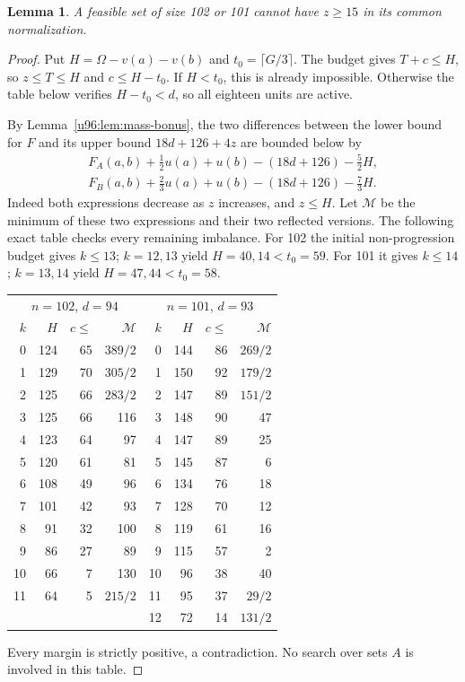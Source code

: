 \documentclass[11pt,a4paper]{article}
\newtheorem{lemma}[theorem]{Lemma}
\theoremstyle{remark}
\begin{document}
\begin{lemma}\label{u96:lem:high100}
A feasible set of size 102 or 101 cannot have $z\geq15$ in its common
normalization.
\end{lemma}
\begin{proof}
Put $H=\Omega-v(a)-v(b)$ and $t_0=\lceil G/3\rceil$.
The budget gives $T+c\leq H$, so $z\leq T\leq H$ and $c\leq H-t_0$.
If $H<t_0$, this is already impossible. Otherwise the table below verifies
$H-t_0<d$, so all eighteen units are active.

By Lemma~\ref{u96:lem:mass-bonus}, the two differences between the lower bound
for $F$ and its upper bound $18d+126+4z$ are bounded below by
\[
\begin{split}
 F_A(a,b)+\tfrac12u(a)+u(b)-(18d+126)-\tfrac52H,\\
 F_B(a,b)+\tfrac23u(a)+u(b)-(18d+126)-\tfrac73H.
\end{split}
\]
Indeed both expressions decrease as $z$ increases, and $z\leq H$.
Let $\mathcal M$ be the minimum of these two expressions and their two
reflected versions. The following exact table checks every remaining
imbalance. For 102 the initial non-progression budget gives $k\leq13$;
$k=12,13$ yield $H=40,14<t_0=59$. For 101 it gives $k\leq14$;
$k=13,14$ yield $H=47,44<t_0=58$.
\begin{center}\small
\begin{tabular}{rrrr|rrrr}
\toprule
\multicolumn{4}{c|}{$n=102$, $d=94$}&\multicolumn{4}{c}{$n=101$, $d=93$}\\
$k$&$H$&$c\leq$&$\mathcal M$&$k$&$H$&$c\leq$&$\mathcal M$\\
\midrule
0&124&65&$389/2$&0&144&86&$269/2$\\
1&129&70&$305/2$&1&150&92&$179/2$\\
2&125&66&$283/2$&2&147&89&$151/2$\\
3&125&66&116&3&148&90&47\\
4&123&64&97&4&147&89&25\\
5&120&61&81&5&145&87&6\\
6&108&49&96&6&134&76&18\\
7&101&42&93&7&128&70&12\\
8&91&32&100&8&119&61&16\\
9&86&27&89&9&115&57&2\\
10&66&7&130&10&96&38&40\\
11&64&5&$215/2$&11&95&37&$29/2$\\
&&&&12&72&14&$131/2$\\
\bottomrule
\end{tabular}
\end{center}
Every margin is strictly positive, a contradiction. No search over sets
$A$ is involved in this table.
\end{proof}
\end{document}

